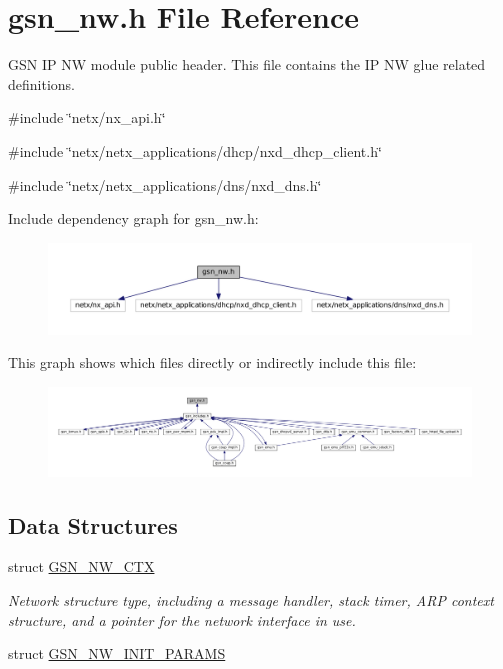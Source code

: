 \hypertarget{a00532}{
\section{gsn\_\-nw.h File Reference}
\label{a00532}
}


GSN IP NW module public header. This file contains the IP NW glue related definitions.  


{\ttfamily \#include \char`\"{}netx/nx\_\-api.h\char`\"{}}\par
{\ttfamily \#include \char`\"{}netx/netx\_\-applications/dhcp/nxd\_\-dhcp\_\-client.h\char`\"{}}\par
{\ttfamily \#include \char`\"{}netx/netx\_\-applications/dns/nxd\_\-dns.h\char`\"{}}\par
Include dependency graph for gsn\_\-nw.h:
\nopagebreak
\begin{figure}[H]
\begin{center}
\leavevmode
\includegraphics[width=400pt]{a00765}
\end{center}
\end{figure}
This graph shows which files directly or indirectly include this file:
\nopagebreak
\begin{figure}[H]
\begin{center}
\leavevmode
\includegraphics[width=400pt]{a00766}
\end{center}
\end{figure}
\subsection*{Data Structures}
\begin{DoxyCompactItemize}
\item 
struct \hyperlink{a00164}{GSN\_\-NW\_\-CTX}
\begin{DoxyCompactList}\small\item\em Network structure type, including a message handler, stack timer, ARP context structure, and a pointer for the network interface in use. \end{DoxyCompactList}\item 
struct \hyperlink{a00165}{GSN\_\-NW\_\-INIT\_\-PARAMS}
\end{DoxyCompactItemize}
